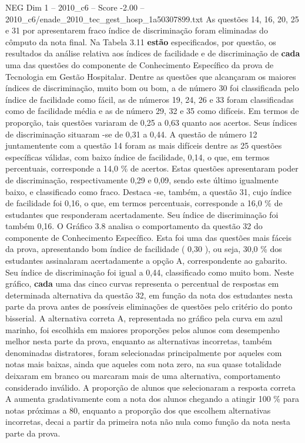 \begin{textsample}{NEG Dim 1 – 2010\_c6 – Score -2.00 – 2010\_c6/enade\_2010\_tec\_gest\_hosp\_1a50307899.txt}
As questões 14, 16, 20, 25 e 31 por apresentarem fraco índice de discriminação foram eliminadas do cômputo da nota final.
Na Tabela 3.11 \textbf{estão} especificados, por questão, os resultados da análise relativa aos índices de facilidade e de discriminação de \textbf{cada} uma das questões do componente de Conhecimento Específico da prova de Tecnologia em Gestão Hospitalar.
Dentre as questões que alcançaram os maiores índices de discriminação, muito bom ou bom, a de número 30 foi classificada pelo índice de facilidade como fácil, as de números 19, 24, 26 e 33 foram classificadas como de facilidade média e as de número 29, 32 e 35 como difíceis.
Em termos de proporção, tais questões variaram de 0,25 a 0,63 quanto aos acertos.
Seus índices de discriminação situaram -se de 0,31 a 0,44.
A questão de número 12 juntamentente com a questão 14 foram as mais difíceis dentre as 25 questões específicas válidas, com baixo índice de facilidade, 0,14, o que, em termos percentuais, corresponde a 14,0 \% de acertos.
Estas questões apresentaram poder de discriminação, respectivamente 0,29 e 0,09, sendo este último igualmente baixo, e classificado como fraco.
Destaca -se, também, a questão 31, cujo índice de facilidade foi 0,16, o que, em termos percentuais, corresponde a 16,0 \% de estudantes que responderam acertadamente.
Seu índice de discriminação foi também 0,16.
O Gráfico 3.8 analisa o comportamento da questão 32 do componente de Conhecimento Específico.
Esta foi uma das questões mais fáceis da prova, apresentando bom índice de facilidade ( 0,30 ), ou seja, 30,0 \% dos estudantes assinalaram acertadamente a opção A, correspondente ao gabarito.
Seu índice de discriminação foi igual a 0,44, classificado como muito bom.
Neste gráfico, \textbf{cada} uma das cinco curvas representa o percentual de respostas em determinada alternativa da questão 32, em função da nota dos estudantes nesta parte da prova antes de possíveis eliminações de questões pelo critério do ponto bisserial.
A alternativa correta A, representada no gráfico pela curva em azul marinho, foi escolhida em maiores proporções pelos alunos com desempenho melhor nesta parte da prova, enquanto as alternativas incorretas, também denominadas distratores, foram selecionadas principalmente por aqueles com notas mais baixas, ainda que aqueles com nota zero, na sua quase totalidade deixaram em branco ou marcaram mais de uma alternativa, comportamento considerado inválido.
A proporção de alunos que selecionaram a resposta correta A aumenta gradativamente com a nota dos alunos chegando a atingir 100 \% para notas próximas a 80, enquanto a proporção dos que escolhem alternativas incorretas, decai a partir da primeira nota não nula como função da nota nesta parte da prova.

\end{textsample}
